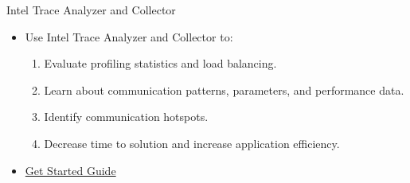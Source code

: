 \documentclass[10pt,t]{beamer}
\begin{document}
\begin{frame}{Intel Trace Analyzer and Collector}
  \begin{itemize}
  \item Use Intel Trace Analyzer and Collector to:
    \begin{enumerate}
    \item Evaluate profiling statistics and load balancing.
    \item Learn about communication patterns, parameters, and performance data.
    \item Identify communication hotspots.
    \item Decrease time to solution and increase application efficiency.
    \end{enumerate}
  \item \href{https://software.intel.com/content/www/us/en/develop/documentation/get-started-with-itac/top.html}{\color{lublue}Get Started Guide}
  \end{itemize}
\end{frame}
\end{document}
